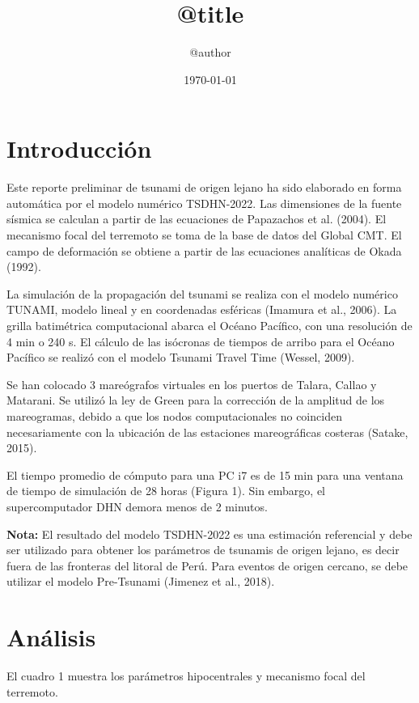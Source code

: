 \documentclass[a4paper,11pt,twocolumn]{article}
\title{\sffamily\bfseries @title}
\author{\sffamily @author}
\date{\sffamily\today}
\begin{document}
\maketitle

\section*{Introducción}

Este reporte preliminar de tsunami de origen lejano ha sido elaborado en forma automática por el modelo numérico TSDHN-2022. Las dimensiones de la fuente sísmica se calculan a partir de las ecuaciones de Papazachos et al. (2004). El mecanismo focal del terremoto se toma de la base de datos del Global CMT. El campo de deformación se obtiene a partir de las ecuaciones analíticas de Okada (1992).

La simulación de la propagación del tsunami se realiza con el modelo numérico TUNAMI, modelo lineal y en coordenadas esféricas (Imamura et al., 2006). La grilla batimétrica computacional abarca el Océano Pacífico, con una resolución de 4 min o 240 s. El cálculo de las isócronas de tiempos de arribo para el Océano Pacífico se realizó con el modelo Tsunami Travel Time (Wessel, 2009).

Se han colocado 3 mareógrafos virtuales en los puertos de Talara, Callao y Matarani. Se utilizó la ley de Green para la corrección de la amplitud de los mareogramas, debido a que los nodos computacionales no coinciden necesariamente con la ubicación de las estaciones mareográficas costeras (Satake, 2015).

El tiempo promedio de cómputo para una PC i7 es de 15 min para una ventana de tiempo de simulación de 28 horas (Figura 1). Sin embargo, el supercomputador DHN demora menos de 2 minutos.

\textbf{Nota:} El resultado del modelo TSDHN-2022 es una estimación referencial y debe ser utilizado para obtener los parámetros de tsunamis de origen lejano, es decir fuera de las fronteras del litoral de Perú. Para eventos de origen cercano, se debe utilizar el modelo Pre-Tsunami (Jimenez et al., 2018).

\newpage
\section*{Análisis}

El cuadro 1 muestra los parámetros hipocentrales y mecanismo focal del terremoto.
\end{document}
